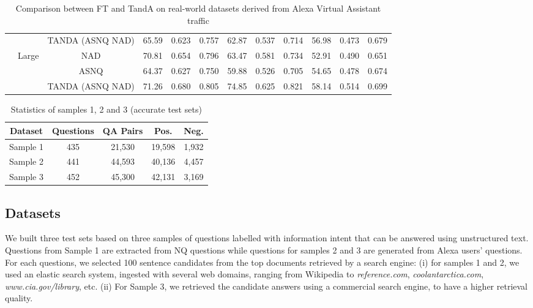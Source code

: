 \documentclass[letterpaper]{article} \usepackage{aaai20}  \usepackage{times}  \usepackage{helvet} \usepackage{courier}  \usepackage[hyphens]{url}  \usepackage{graphicx} \urlstyle{rm} \def\UrlFont{\rm}  \usepackage{graphicx}  \usepackage{todonotes}
\newcommand{\TANDA}{T{\sc and}A}
\begin{document}
\begin{table*}[h]
\begin{small}
\begin{tabular}{|c|c|c|c|c|c|c|c|c|c|c|c|}
                         &                        & TANDA (ASNQ  NAD) & 65.59       & 0.623      & 0.757      & 62.87        & 0.537       & 0.714       & 56.98         & 0.473        & 0.679       \\ \cline{2-12} 
                         & \multirow{3}{*}{Large} & NAD                            & 70.81       & 0.654      & 0.796      & 63.47        & 0.581       & 0.734       & 52.91         & 0.490        & 0.651       \\ \cline{3-12} 
                         &                        & ASNQ                            &  64.37	& 0.627	& 0.750   & 59.88        & 0.526       & 0.705       & 54.65         & 0.478        & 0.674       \\ \cline{3-12} 
                         &                        & TANDA (ASNQ  NAD) & 71.26       & 0.680      & 0.805      & 74.85        & 0.625       & 0.821       & 58.14         & 0.514        & 0.699       \\ \hline
\end{tabular}
\caption{Comparison between FT and {\TANDA} on real-world datasets derived from Alexa Virtual Assistant traffic}
\label{Table:Alexa_dataset_results}
\end{small}
\vspace{-.8em}
\end{table*}

\begin{table}[h]
\small
\center
\begin{tabular}{|c|c|c|c|c|}
\hline
Dataset             & Questions & QA Pairs & Pos. & Neg. \\ \hline
Sample 1    	& 435       & 21,530    & 19,598        & 1,932        \\ \hline
Sample 2    	& 441       & 44,593    & 40,136        & 4,457        \\ \hline
Sample 3 		& 452       & 45,300    & 42,131        & 3,169        \\ \hline
\end{tabular}
\caption{Statistics of samples 1, 2  and 3 (accurate test sets)}
\label{Table:test_dataset_description}
\vspace{-1em}
\end{table}

\subsection{Datasets}
We built three test sets based on three samples of questions labelled with information intent that can be answered using unstructured text.
Questions from Sample 1 are extracted from NQ questions while questions for samples 2 and 3 are generated from Alexa users' questions. For each questions, we selected 100 sentence candidates from the top documents retrieved by a search engine: (i) for samples 1 and 2, we used an elastic search system, ingested with several web domains, ranging from Wikipedia to \emph{reference.com}, \emph{coolantarctica.com}, \emph{www.cia.gov/library}, etc. (ii) For Sample 3, we retrieved the candidate answers using a commercial search engine, to have a higher retrieval quality. 
\end{document}
